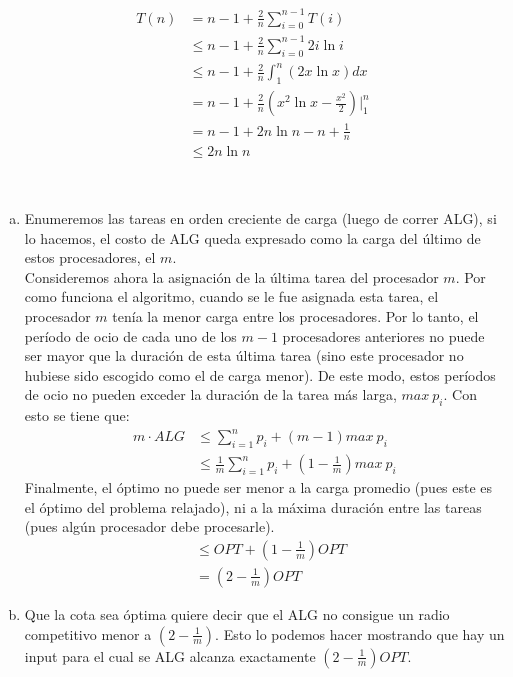 \documentclass[dcc,uchile]{fcfmcourse}
\theoremstyle{plain}
\theoremstyle{definition}
\begin{document}
\begin{problems}
\begin{enumerate}[a)]
\begin{align*}
        T(n) &= n-1 + \frac{2}{n}\sum_{i=0}^{n-1}T(i) \\
        &\le n-1 + \frac{2}{n}\sum_{i=0}^{n-1}2i\ln{i}\\
        &\le n-1 + \frac{2}{n}\int_{1}^{n}(2x\ln{x})dx\\
        &= n-1 + \frac{2}{n} (x^2\ln{x} - \frac{x^2}{2})\Big|_1^n\\
        &= n-1 + 2n\ln{n} - n + \frac{1}{n}\\
        &\le 2n\ln{n}
    \end{align*}
\end{enumerate}
\\
\begin{enumerate}[a)]
    \item Enumeremos las tareas en orden creciente de carga (luego de correr ALG), si lo hacemos, el costo de ALG queda expresado como la carga del último de estos procesadores, el $m$.\\
    Consideremos ahora la asignación de la última tarea del procesador $m$. Por como funciona el algoritmo, cuando se le fue asignada esta tarea, el procesador $m$ tenía la menor carga entre los procesadores. Por lo tanto, el período de ocio de cada uno de los $m-1$ procesadores anteriores no puede ser mayor que la duración de esta última tarea (sino este procesador no hubiese sido escogido como el de carga menor). De este modo, estos períodos de ocio no pueden exceder la duración de la tarea más larga, $max\ p_{i}$. Con esto se tiene que:
    \begin{align*}
        m\cdot ALG &\le \sum_{i=1}^n p_{i} + (m-1)max\ p_{i}\\
        &\le \frac{1}{m} \sum_{i=1}^n p_{i} + \left(1-\frac{1}{m}\right)max\ p_{i}
    \end{align*}
    Finalmente, el óptimo no puede ser menor a la carga promedio (pues este es el óptimo del problema relajado), ni a la máxima duración entre las tareas (pues algún procesador debe procesarle).
    \begin{align*}
        & \le OPT + \left(1-\frac{1}{m}\right)OPT\\
        & = \left(2-\frac{1}{m}\right)OPT        
    \end{align*}
    \item Que la cota sea óptima quiere decir que el ALG no consigue un radio competitivo menor a $\left(2-\frac{1}{m}\right)$. Esto lo podemos hacer mostrando que hay un input para el cual se ALG alcanza exactamente $\left(2-\frac{1}{m}\right)OPT$.\\
    

\end{enumerate}
\end{problems}
\end{document}
